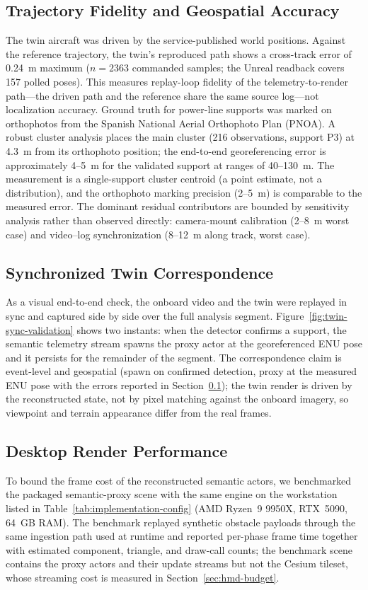 \documentclass[fleqn]{VRIH2025}
\begin{document}
\subsection{Trajectory Fidelity and Geospatial Accuracy}
\label{sec:trajectory-fidelity}
The twin aircraft was driven by the service-published world positions. Against the reference trajectory, the twin's reproduced path shows a cross-track error of 0.24~m maximum ($n=2363$ commanded samples; the Unreal readback covers 157 polled poses). This measures replay-loop fidelity of the telemetry-to-render path---the driven path and the reference share the same source log---not localization accuracy. Ground truth for power-line supports was marked on orthophotos from the Spanish National Aerial Orthophoto Plan (PNOA). A robust cluster analysis places the main cluster (216 observations, support P3) at 4.3~m from its orthophoto position; the end-to-end georeferencing error is approximately 4--5~m for the validated support at ranges of 40--130~m. The measurement is a single-support cluster centroid (a point estimate, not a distribution), and the orthophoto marking precision (2--5~m) is comparable to the measured error. The dominant residual contributors are bounded by sensitivity analysis rather than observed directly: camera-mount calibration (2--8~m worst case) and video--log synchronization (8--12~m along track, worst case).

\subsection{Synchronized Twin Correspondence}
\label{sec:twin-sync}
As a visual end-to-end check, the onboard video and the twin were replayed in sync and captured side by side over the full analysis segment. Figure~\ref{fig:twin-sync-validation} shows two instants: when the detector confirms a support, the semantic telemetry stream spawns the proxy actor at the georeferenced ENU pose and it persists for the remainder of the segment. The correspondence claim is event-level and geospatial (spawn on confirmed detection, proxy at the measured ENU pose with the errors reported in Section~\ref{sec:trajectory-fidelity}); the twin render is driven by the reconstructed state, not by pixel matching against the onboard imagery, so viewpoint and terrain appearance differ from the real frames.

\subsection{Desktop Render Performance}
\label{sec:render-performance}
To bound the frame cost of the reconstructed semantic actors, we benchmarked the packaged semantic-proxy scene with the same engine on the workstation listed in Table~\ref{tab:implementation-config} (AMD Ryzen~9 9950X, RTX~5090, 64~GB RAM). The benchmark replayed synthetic obstacle payloads through the same ingestion path used at runtime and reported per-phase frame time together with estimated component, triangle, and draw-call counts; the benchmark scene contains the proxy actors and their update streams but not the Cesium tileset, whose streaming cost is measured in Section~\ref{sec:hmd-budget}.
\end{document}
